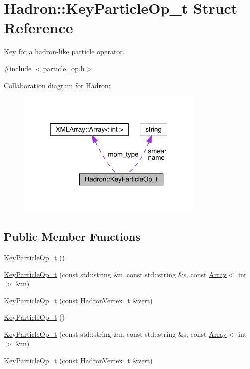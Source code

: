 \hypertarget{structHadron_1_1KeyParticleOp__t}{}\section{Hadron\+:\+:Key\+Particle\+Op\+\_\+t Struct Reference}
\label{structHadron_1_1KeyParticleOp__t}


Key for a hadron-\/like particle operator.  




{\ttfamily \#include $<$particle\+\_\+op.\+h$>$}



Collaboration diagram for Hadron\+:\nopagebreak
\begin{figure}[H]
\begin{center}
\leavevmode
\includegraphics[width=256pt]{db/db4/structHadron_1_1KeyParticleOp__t__coll__graph}
\end{center}
\end{figure}
\subsection*{Public Member Functions}
\begin{DoxyCompactItemize}
\item 
\mbox{\hyperlink{structHadron_1_1KeyParticleOp__t_aeb83d38886aa274e5e579d1828529809}{Key\+Particle\+Op\+\_\+t}} ()
\item 
\mbox{\hyperlink{structHadron_1_1KeyParticleOp__t_af5270bac6d21394783c83e08224d71b6}{Key\+Particle\+Op\+\_\+t}} (const std\+::string \&n, const std\+::string \&s, const \mbox{\hyperlink{classXMLArray_1_1Array}{Array}}$<$ int $>$ \&m)
\item 
\mbox{\hyperlink{structHadron_1_1KeyParticleOp__t_a11187f2c592a8404deba8a067432275e}{Key\+Particle\+Op\+\_\+t}} (const \mbox{\hyperlink{structHadron_1_1HadronVertex__t}{Hadron\+Vertex\+\_\+t}} \&vert)
\item 
\mbox{\hyperlink{structHadron_1_1KeyParticleOp__t_aeb83d38886aa274e5e579d1828529809}{Key\+Particle\+Op\+\_\+t}} ()
\item 
\mbox{\hyperlink{structHadron_1_1KeyParticleOp__t_af5270bac6d21394783c83e08224d71b6}{Key\+Particle\+Op\+\_\+t}} (const std\+::string \&n, const std\+::string \&s, const \mbox{\hyperlink{classXMLArray_1_1Array}{Array}}$<$ int $>$ \&m)
\item 
\mbox{\hyperlink{structHadron_1_1KeyParticleOp__t_a11187f2c592a8404deba8a067432275e}{Key\+Particle\+Op\+\_\+t}} (const \mbox{\hyperlink{structHadron_1_1HadronVertex__t}{Hadron\+Vertex\+\_\+t}} \&vert)
\end{DoxyCompactItemize}
